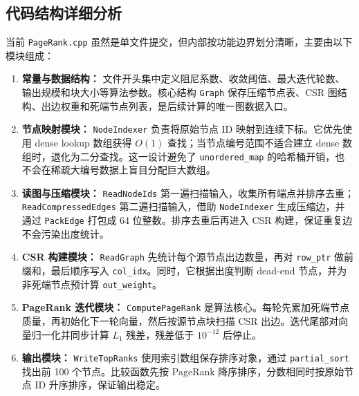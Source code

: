 \documentclass[UTF8,a4paper,10pt]{ctexart}
\begin{document}
\subsection{代码结构详细分析}

当前 \texttt{PageRank.cpp} 虽然是单文件提交，但内部按功能边界划分清晰，主要由以下模块组成：

\begin{enumerate}
  \item \textbf{常量与数据结构：} 文件开头集中定义阻尼系数、收敛阈值、最大迭代轮数、输出规模和块大小等算法参数。核心结构 \texttt{Graph} 保存压缩节点表、CSR 图结构、出边权重和死端节点列表，是后续计算的唯一图数据入口。
  \item \textbf{节点映射模块：} \texttt{NodeIndexer} 负责将原始节点 ID 映射到连续下标。它优先使用 dense lookup 数组获得 $O(1)$ 查找；当节点编号范围不适合建立 dense 数组时，退化为二分查找。这一设计避免了 \texttt{unordered\_map} 的哈希桶开销，也不会在稀疏大编号数据上盲目分配巨大数组。
  \item \textbf{读图与压缩模块：} \texttt{ReadNodeIds} 第一遍扫描输入，收集所有端点并排序去重；\texttt{ReadCompressedEdges} 第二遍扫描输入，借助 \texttt{NodeIndexer} 生成压缩边，并通过 \texttt{PackEdge} 打包成 64 位整数。排序去重后再进入 CSR 构建，保证重复边不会污染出度统计。
  \item \textbf{CSR 构建模块：} \texttt{ReadGraph} 先统计每个源节点出边数量，再对 \texttt{row\_ptr} 做前缀和，最后顺序写入 \texttt{col\_idx}。同时，它根据出度判断 dead-end 节点，并为非死端节点预计算 \texttt{out\_weight}。
  \item \textbf{PageRank 迭代模块：} \texttt{ComputePageRank} 是算法核心。每轮先累加死端节点质量，再初始化下一轮向量，然后按源节点块扫描 CSR 出边。迭代尾部对向量归一化并同步计算 $L_1$ 残差，残差低于 $10^{-12}$ 后停止。
  \item \textbf{输出模块：} \texttt{WriteTopRanks} 使用索引数组保存排序对象，通过 \texttt{partial\_sort} 找出前 100 个节点。比较函数先按 PageRank 降序排序，分数相同时按原始节点 ID 升序排序，保证输出稳定。
\end{enumerate}
\end{document}

